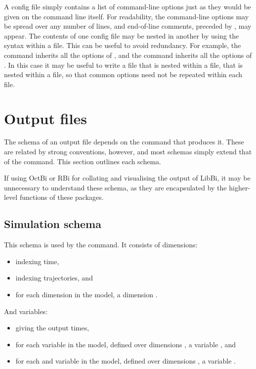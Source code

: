 A config file simply contains a list of command-line options just as they
would be given on the command line itself. For readability, the command-line
options may be spread over any number of lines, and end-of-line comments,
preceded by \bitt{\#}, may appear. The contents of one config file may be
nested in another by using the  syntax within a file. This
can be useful to avoid redundancy. For example, the  command
inherits all the options of , and the 
command inherits all the options of . In this case it may be
useful to write a  file that is nested within a
 file, that is nested within a  file, so
that common options need not be repeated within each file.

\section{Output files}

The schema of an output file depends on the command that produces it. These
are related by strong conventions, however, and most schemas simply extend
that of the  command. This section outlines each schema.

\begin{tip}
If using OctBi or RBi for collating and visualising the output of LibBi, it
may be unnecessary to understand these schema, as they are encapsulated by
the higher-level functions of these packages.
\end{tip}

\subsection{Simulation schema}

This schema is used by the  command. It consists of
dimensions:
\begin{itemize}
\item {} indexing time,
\item {} indexing trajectories, and
\item for each dimension  in the model, a dimension
  .
\end{itemize}
And variables:
\begin{itemize}
\item {} giving the output times,
\item for each  variable  in the model,
  defined over dimensions , a variable
  , and
\item for each  and  variable  in the
  model, defined over dimensions , a variable
  .
\end{itemize}

